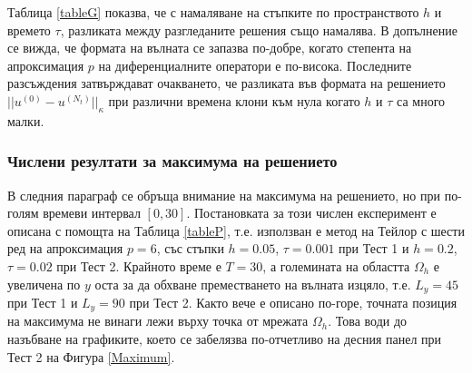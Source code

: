 \documentclass[a4paper]{article}
\theoremstyle{remark}
\begin{document}
\FloatBarrier
Таблица \ref{tableG} показва, че с намаляване на стъпките по пространството $h$ и времето $\tau$, разликата между разгледаните решения също намалява. В допълнение се вижда, че формата на вълната се запазва по-добре, когато степента на апроксимация $p$ на диференциалните оператори е по-висока. Последните разсъждения затвърждават очакването, че разликата във формата на решението $||u^{(0)} - u^{(N_t)}||_\kappa$ при различни времена клони към нула когато $h$ и $\tau$ са много малки.

\subsubsection{Числени резултати за максимума на решението}
В следния параграф се обръща внимание на максимума на решението, но при по-голям времеви интервал $[0, 30]$. Постановката за този числен експеримент е описана с помощта на Таблица \ref{tableP}, т.е. използван е метод на Тейлор с шести ред на апроксимация $p=6$, със стъпки $h=0.05$, $\tau = 0.001$ при Тест 1 и $h=0.2$,  $\tau=0.02$ при Тест 2. Крайното време е $T=30$, а големината на областта $\Omega_h$ е увеличена по $y$ оста за да обхване преместването на вълната изцяло, т.е. $L_y = 45$ при Тест 1 и $L_y = 90$ при Тест 2. Както вече е описано по-горе, точната позиция на максимума не винаги лежи върху точка от мрежата $\Omega_h$. Това води до назъбване на графиките, което се забелязва по-отчетливо на десния панел при Тест 2 на Фигура \ref{Maximum}. 
\end{document}

